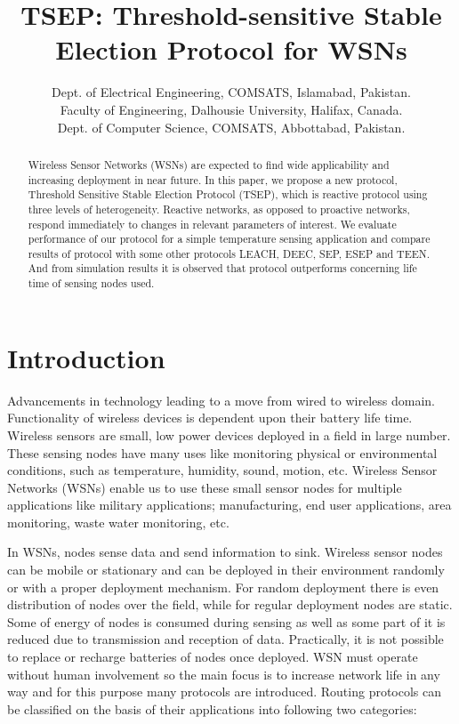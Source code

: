 \documentclass[conference]{IEEEtran}
\begin{document}
\title{TSEP: Threshold-sensitive Stable\\ Election Protocol for WSNs}


\author{
        Dept. of Electrical Engineering, COMSATS, Islamabad, Pakistan. \\
        Faculty of Engineering, Dalhousie University, Halifax, Canada.\\
        Dept. of Computer Science, COMSATS, Abbottabad, Pakistan.

        }

\maketitle
\begin{abstract}

Wireless Sensor Networks (WSNs) are expected to find wide applicability and increasing deployment in near future. In this paper, we propose a new protocol, Threshold Sensitive Stable Election Protocol (TSEP), which is reactive protocol using three levels of heterogeneity. Reactive networks, as opposed to proactive networks, respond immediately to changes in relevant parameters of interest. We evaluate performance of our protocol for a simple temperature sensing application and compare results of protocol with some other protocols LEACH, DEEC, SEP, ESEP and TEEN. And from simulation results it is observed that protocol outperforms concerning life time of sensing nodes used.
\end{abstract}

\section{Introduction}
Advancements in technology leading to a move from wired to wireless domain. Functionality of wireless devices is dependent upon their battery life time. Wireless sensors are small, low power devices deployed in a field in large number. These sensing nodes have many uses like monitoring physical or environmental conditions, such as temperature, humidity, sound, motion, etc. Wireless Sensor Networks (WSNs) enable us to use these small sensor nodes for multiple applications like military applications; manufacturing, end user applications, area monitoring, waste water monitoring, etc.

In WSNs, nodes sense data and send information to sink. Wireless sensor nodes can be mobile or stationary and can be deployed in their environment randomly or with a proper deployment mechanism. For random deployment there is even distribution of nodes over the field, while for regular deployment nodes are static. Some of energy of nodes is consumed during sensing as well as some part of it is reduced due to transmission and reception of data. Practically, it is not possible to replace or recharge batteries of nodes once deployed. WSN must operate without human involvement so the main focus is to increase network life in any way and for this purpose many protocols are introduced. Routing protocols can be classified on the basis of their applications into following two categories:\\
\end{document}
